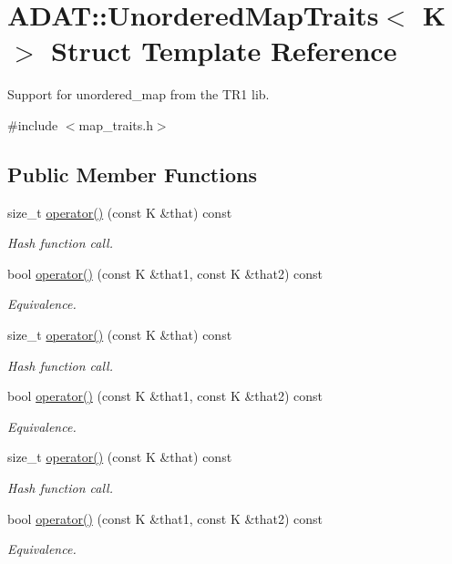 \hypertarget{structADAT_1_1UnorderedMapTraits}{}\section{A\+D\+AT\+:\+:Unordered\+Map\+Traits$<$ K $>$ Struct Template Reference}
\label{structADAT_1_1UnorderedMapTraits}


Support for unordered\+\_\+map from the T\+R1 lib.  




{\ttfamily \#include $<$map\+\_\+traits.\+h$>$}

\subsection*{Public Member Functions}
\begin{DoxyCompactItemize}
\item 
size\+\_\+t \mbox{\hyperlink{structADAT_1_1UnorderedMapTraits_ab9d8c80fb0f561fdadad5be6263d3f94}{operator()}} (const K \&that) const
\begin{DoxyCompactList}\small\item\em Hash function call. \end{DoxyCompactList}\item 
bool \mbox{\hyperlink{structADAT_1_1UnorderedMapTraits_a14c1daf5e4530fc4c749ec681103e7a2}{operator()}} (const K \&that1, const K \&that2) const
\begin{DoxyCompactList}\small\item\em Equivalence. \end{DoxyCompactList}\item 
size\+\_\+t \mbox{\hyperlink{structADAT_1_1UnorderedMapTraits_ab9d8c80fb0f561fdadad5be6263d3f94}{operator()}} (const K \&that) const
\begin{DoxyCompactList}\small\item\em Hash function call. \end{DoxyCompactList}\item 
bool \mbox{\hyperlink{structADAT_1_1UnorderedMapTraits_a14c1daf5e4530fc4c749ec681103e7a2}{operator()}} (const K \&that1, const K \&that2) const
\begin{DoxyCompactList}\small\item\em Equivalence. \end{DoxyCompactList}\item 
size\+\_\+t \mbox{\hyperlink{structADAT_1_1UnorderedMapTraits_ab9d8c80fb0f561fdadad5be6263d3f94}{operator()}} (const K \&that) const
\begin{DoxyCompactList}\small\item\em Hash function call. \end{DoxyCompactList}\item 
bool \mbox{\hyperlink{structADAT_1_1UnorderedMapTraits_a14c1daf5e4530fc4c749ec681103e7a2}{operator()}} (const K \&that1, const K \&that2) const
\begin{DoxyCompactList}\small\item\em Equivalence. \end{DoxyCompactList}\end{DoxyCompactItemize}


